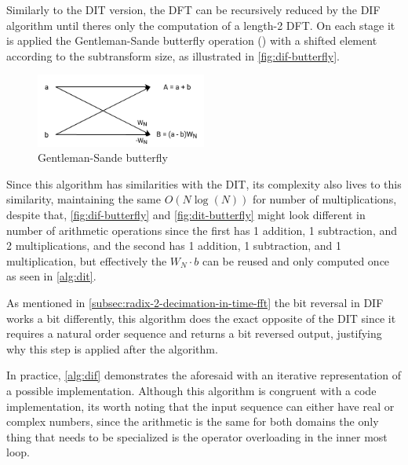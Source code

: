 \documentclass[
  oneside,
  11pt, a4paper,
  footinclude=true,
  headinclude=true,
  cleardoublepage=empty
]{scrbook}
\begin{document}
Similarly to the DIT version, the DFT can be recursively reduced by the DIF algorithm until theres only the computation of a length-2 DFT. On each stage it is applied the Gentleman-Sande butterfly operation (\cite{chu1999inside}) with a shifted element according to the subtransform size, as illustrated in \autoref{fig:dif-butterfly}.

\begin{figure}[h]
    \centering
    \includegraphics[width=0.5\textwidth]{img/dif_butterfly.png}
    \caption{Gentleman-Sande butterfly}
    \label{fig:dif-butterfly}
\end{figure}

Since this algorithm has similarities with the DIT, its complexity also lives to this similarity, maintaining the same \(O(N \log{(N)})\) for number of multiplications, despite that, \autoref{fig:dif-butterfly} and \autoref{fig:dit-butterfly} might look different in number of arithmetic operations since the first has 1 addition, 1 subtraction, and 2 multiplications, and the second has 1 addition, 1 subtraction, and 1 multiplication, but effectively the \(W_{N} \cdot b\) can be reused and only computed once as seen in \autoref{alg:dit}.

As mentioned in \autoref{subsec:radix-2-decimation-in-time-fft} the bit reversal in DIF works a bit differently, this algorithm does the exact opposite of the DIT since it requires a natural order sequence and returns a bit reversed output, justifying why this step is applied after the algorithm.

In practice, \autoref{alg:dif} demonstrates the aforesaid with an iterative representation of a possible implementation. Although this algorithm is congruent with a code implementation, its worth noting that the input sequence can either have real or complex numbers, since the arithmetic is the same for both domains the only thing that needs to be specialized is the operator overloading in the inner most loop.
\end{document}
